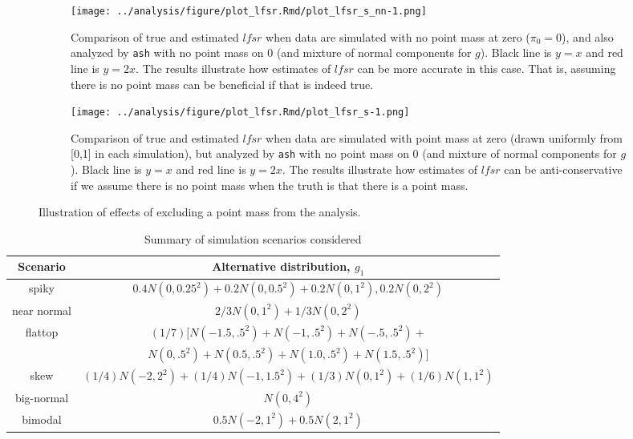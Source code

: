 \documentclass[11pt]{article}
\def\lfsr{\textit{lfsr}}
\def\ash{{\tt ash}\xspace}
\begin{document}
\begin{figure}
\begin{center}
\begin{subfigure}{\textwidth}
\texttt{[image: ../analysis/figure/plot\_lfsr.Rmd/plot\_lfsr\_s\_nn-1.png]} 
\caption{Comparison of true and estimated $\lfsr$ when data are simulated with no point mass at zero ($\pi_0=0$), and also analyzed by \ash with no point mass on 0 (and mixture of normal components for $g$). Black line is $y=x$ and red line is $y=2x$. The results illustrate how estimates of $\lfsr$ can be more accurate in this case. That is, assuming there is no point mass can be beneficial if that is indeed true.}  \label{fig:lfsr-nn}
\end{subfigure}
\begin{subfigure}{\textwidth}
\texttt{[image: ../analysis/figure/plot\_lfsr.Rmd/plot\_lfsr\_s-1.png]} 
\caption{Comparison of true and estimated $\lfsr$ when data are simulated with point mass at zero (drawn uniformly from [0,1] in each simulation), but analyzed by \ash with no point mass on 0 (and mixture of normal components for $g$). Black line is $y=x$ and red line is $y=2x$. The results illustrate how estimates of $\lfsr$ can be anti-conservative if we assume there is no point mass when the truth is that there is a point mass.} \label{fig:lfsr-s}
\end{subfigure}
\end{center}
\caption{Illustration of effects of excluding a point mass from the analysis.} \label{fig:lfsr-nopointmass}
\end{figure}



\begin{table}[!ht]
\centering\begin{tabular}{c c } \toprule
Scenario & Alternative distribution, $g_1$  \\ \midrule
spiky & $0.4 N(0,0.25^2) + 0.2 N(0,0.5^2) + 0.2 N(0,1^2), 0.2 N(0,2^2) $\\
near normal & $2/3 N(0,1^2) + 1/3 N(0,2^2)$ \\
flattop& $(1/7) [N(-1.5,.5^2) + N(-1,.5^2) + N(-.5,.5^2) +$ \\
 &  $N(0,.5^2) +N(0.5,.5^2)  +N(1.0,.5^2) + N(1.5,.5^2)]$  \\
skew & $(1/4) N(-2,2^2) + (1/4) N(-1,1.5^2) +  (1/3) N(0,1^2) + (1/6) N(1,1^2) $\\
big-normal & $N(0,4^2)$ \\ 
bimodal & $0.5 N(-2,1^2) + 0.5 N(2,1^2)$ \\ \bottomrule
\end{tabular}
\caption{Summary of simulation scenarios considered} \label{table:scenarios}
\end{table}
\end{document}
